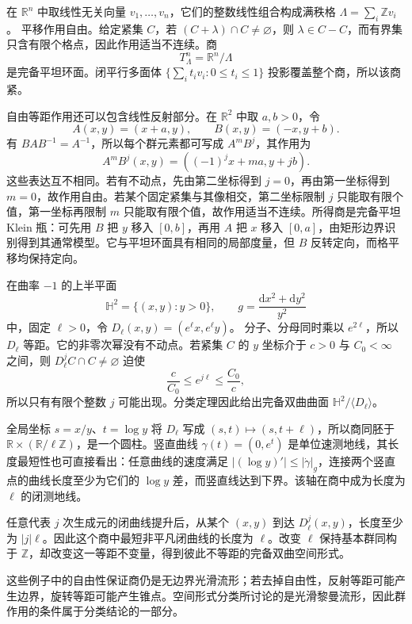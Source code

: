 \begin{example}\label{g3:exm:flat-torus-klein-spaceforms}
	在 \(\mathbb R^n\) 中取线性无关向量 \(v_1,\ldots,v_n\)，它们的整数线性组合构成满秩格
	\(\Lambda=\sum_i\mathbb Zv_i\)。
	平移作用自由。给定紧集 \(C\)，若 \((C+\lambda)\cap C\ne\varnothing\)，则 \(\lambda\in C-C\)，而有界集只含有限个格点，因此作用适当不连续。商
	\[
		T_\Lambda^n=\mathbb R^n/\Lambda
	\]
	是完备平坦环面。闭平行多面体
	\(\{\sum_it_iv_i:0\le t_i\le1\}\)
	投影覆盖整个商，所以该商紧。

	自由等距作用还可以包含线性反射部分。在 \(\mathbb R^2\) 中取 \(a,b>0\)，令
	\[
		A(x,y)=(x+a,y),\qquad
		B(x,y)=(-x,y+b).
	\]
	有 \(BAB^{-1}=A^{-1}\)，所以每个群元素都可写成 \(A^mB^j\)，其作用为
	\[
		A^mB^j(x,y)=((-1)^jx+ma,y+jb).
	\]
	这些表达互不相同。若有不动点，先由第二坐标得到 \(j=0\)，再由第一坐标得到 \(m=0\)，故作用自由。若某个固定紧集与其像相交，第二坐标限制 \(j\) 只能取有限个值，第一坐标再限制 \(m\) 只能取有限个值，故作用适当不连续。所得商是完备平坦 Klein 瓶：可先用 \(B\) 把 \(y\) 移入 \([0,b]\)，再用 \(A\) 把 \(x\) 移入 \([0,a]\)，由矩形边界识别得到其通常模型。它与平坦环面具有相同的局部度量，但 \(B\) 反转定向，而格平移均保持定向。
\end{example}

\begin{example}\label{g3:exm:hyperbolic-cyclic-spaceform}
	在曲率 \(-1\) 的上半平面
	\[
		\mathbb H^2=\{(x,y):y>0\},\qquad
		g=\frac{\mathrm dx^2+\mathrm dy^2}{y^2}
	\]
	中，固定 \(\ell>0\)，令
	\(D_\ell(x,y)=(e^\ell x,e^\ell y)\)。
	分子、分母同时乘以 \(e^{2\ell}\)，所以 \(D_\ell\) 等距。它的非零次幂没有不动点。若紧集 \(C\) 的 \(y\) 坐标介于 \(c>0\) 与 \(C_0<\infty\) 之间，则
	\(D_\ell^jC\cap C\ne\varnothing\)
	迫使
	\[
		\frac c{C_0}\le e^{j\ell}\le\frac{C_0}c,
	\]
	所以只有有限个整数 \(j\) 可能出现。分类定理因此给出完备双曲曲面
	\(\mathbb H^2/\langle D_\ell\rangle\)。

	全局坐标 \(s=x/y\)、\(t=\log y\) 将 \(D_\ell\) 写成
	\((s,t)\mapsto(s,t+\ell)\)，所以商同胚于
	\(\mathbb R\times(\mathbb R/\ell\mathbb Z)\)，是一个圆柱。竖直曲线
	\(\gamma(t)=(0,e^t)\) 是单位速测地线，其长度最短性也可直接看出：任意曲线的速度满足
	\(|(\log y)'|\le|\dot\gamma|_g\)，连接两个竖直点的曲线长度至少为它们的 \(\log y\) 差，而竖直线达到下界。该轴在商中成为长度为 \(\ell\) 的闭测地线。

	任意代表 \(j\) 次生成元的闭曲线提升后，从某个 \((x,y)\) 到达
	\(D_\ell^j(x,y)\)，长度至少为 \(|j|\ell\)。因此这个商中最短非平凡闭曲线的长度为 \(\ell\)。改变 \(\ell\) 保持基本群同构于 \(\mathbb Z\)，却改变这一等距不变量，得到彼此不等距的完备双曲空间形式。
\end{example}

这些例子中的自由性保证商仍是无边界光滑流形；若去掉自由性，反射等距可能产生边界，旋转等距可能产生锥点。空间形式分类所讨论的是光滑黎曼流形，因此群作用的条件属于分类结论的一部分。
